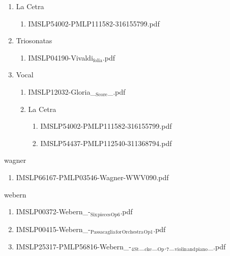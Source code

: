 \documentclass[11pt]{article}
\begin{document}
\begin{enumerate}
\item La Cetra
\label{sec-1-1-1-1-44-72-2}
\begin{enumerate}
\item IMSLP54002-PMLP111582-316155799.pdf
\label{sec-1-1-1-1-44-72-2-1}
\end{enumerate}

\item Triosonatas
\label{sec-1-1-1-1-44-72-3}
\begin{enumerate}
\item IMSLP04190-Vivaldi$_{\text{folia}}$.pdf
\label{sec-1-1-1-1-44-72-3-1}
\end{enumerate}

\item Vocal
\label{sec-1-1-1-1-44-72-4}
\begin{enumerate}
\item IMSLP12032-Gloria\_$_{\text{Score}}$\_.pdf
\label{sec-1-1-1-1-44-72-4-1}

\item La Cetra
\label{sec-1-1-1-1-44-72-4-2}
\begin{enumerate}
\item IMSLP54002-PMLP111582-316155799.pdf
\label{sec-1-1-1-1-44-72-4-2-1}

\item IMSLP54437-PMLP112540-311368794.pdf
\label{sec-1-1-1-1-44-72-4-2-2}
\end{enumerate}
\end{enumerate}
\end{enumerate}

\item wagner
\label{sec-1-1-1-1-44-73}
\begin{enumerate}
\item IMSLP66167-PMLP03546-Wagner-WWV090.pdf
\label{sec-1-1-1-1-44-73-1}
\end{enumerate}

\item webern
\label{sec-1-1-1-1-44-74}
\begin{enumerate}
\item IMSLP00372-Webern\_-$_{\text{Six}}$$_{\text{pieces}}$$_{\text{Op6}}$.pdf
\label{sec-1-1-1-1-44-74-1}

\item IMSLP00415-Webern\_-$_{\text{Passacaglia}}$$_{\text{for}}$$_{\text{Orchestra}}$$_{\text{Op1}}$.pdf
\label{sec-1-1-1-1-44-74-2}

\item IMSLP25317-PMLP56816-Webern\_-$_{\text{4}}$$_{\text{St}}$\_$_{\text{cke}}$\_$_{\text{Op}}$.$_{\text{7}}$\_$_{\text{violin}}$$_{\text{and}}$$_{\text{piano}}$\_.pdf
\label{sec-1-1-1-1-44-74-3}
\end{enumerate}
\end{document}
